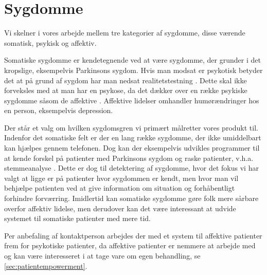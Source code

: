 \chapter{Sygdomme}
Vi skelner i vores arbejde mellem tre kategorier af sygdomme, disse værende somatisk, psykisk og affektiv.

Somatiske sygdomme er kendetegnende ved at være sygdomme, der grunder i det kropslige, eksempelvis Parkinsons sygdom.
Hvis man modsat er psykotisk betyder det at på grund af sygdom har man nedsat realitetstestning \citep{misc:netpsykpsykose}.
Dette skal ikke forveksles med at man har en psykose, da det dækker over en række psykiske sygdomme såsom de affektive \citep{misc:netpsykpsykose}.
Affektive lidelser omhandler humørændringer hos en person, eksempelvis depression.

Der står et valg om hvilken sygdomsgren vi primært målretter vores produkt til.
Indenfor det somatiske felt er der en lang række sygdomme, der ikke umiddelbart kan hjælpes gennem telefonen.
Dog kan der eksempelvis udvikles programmer til at kende forskel på patienter med Parkinsons sygdom og raske patienter, v.h.a. stemmeanalyse \citep{6168572}.
Dette er dog til detektering af sygdomme, hvor det fokus vi har valgt at ligge er på patienter hvor sygdommen er kendt, men hvor man vil behjælpe patienten ved at give information om situation og forhåbentligt forhindre forværring.
Imidlertid kan somatiske sygdomme gøre folk mere sårbare overfor affektiv lidelse, men derudover kan det være interessant at udvide systemet til somatiske patienter med mere tid.

Per anbefaling af kontaktperson \citet{misc:janne-rasmussen} arbejdes der med et system til affektive patienter frem for psykotiske patienter, da affektive patienter er nemmere at arbejde med og kan være interesseret i at tage vare om egen behandling, se \cref{sec:patientempowerment}.